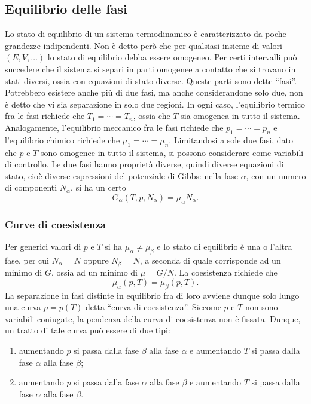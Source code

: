 \subsection{Equilibrio delle fasi}
Lo stato di equilibrio di un sistema termodinamico è caratterizzato da poche grandezze indipendenti. Non è detto però che per qualsiasi insieme di valori $(E,V,\dots)$ lo stato di equilibrio debba essere omogeneo. Per certi intervalli può succedere che il sistema si separi in parti omogenee a contatto che si trovano in stati diversi, ossia con equazioni di stato diverse. Queste parti sono dette ``fasi''. Potrebbero esistere anche più di due fasi, ma anche considerandone solo due, non è detto che vi sia separazione in solo due regioni. In ogni caso, l'equilibrio termico fra le fasi richiede che $T_1 = \cdots = T_n$, ossia che $T$ sia omogenea in tutto il sistema. Analogamente, l'equilibrio meccanico fra le fasi richiede che $p_1 = \cdots = p_n$ e l'equilibrio chimico richiede che $\mu_1 = \cdots = \mu_n$. Limitandosi a sole due fasi, dato che $p$ e $T$ sono omogenee in tutto il sistema, si possono considerare come variabili di controllo. Le due fasi hanno proprietà diverse, quindi diverse equazioni di stato, cioè diverse  espressioni del potenziale di Gibbs: nella fase $\alpha$, con un numero di componenti $N_\alpha$, si ha un certo
\begin{equation}
    G_\alpha(T,p,N_\alpha) = \mu_\alpha N_\alpha.
\end{equation}

\subsubsection{Curve di coesistenza}
Per generici valori di $p$ e $T$ si ha $\mu_\alpha \neq \mu_\beta$ e lo stato di equilibrio è una o l'altra fase, per cui $N_\alpha = N$ oppure $N_\beta = N$, a seconda di quale corrisponde ad un minimo di $G$, ossia ad un minimo di $\mu = G/N$. La coesistenza richiede che 
\begin{equation}
\label{eq: condizione coesistenza}
    \mu_\alpha(p,T) = \mu_\beta(p,T).
\end{equation}
La separazione in fasi distinte in equilibrio fra di loro avviene dunque solo lungo una curva $p = p(T)$ detta ``curva di coesistenza''. Siccome $p$ e $T$ non sono variabili coniugate, la pendenza della curva di coesistenza non è fissata. Dunque, un tratto di tale curva può essere di due tipi:
\begin{enumerate}
    \item aumentando $p$ si passa dalla fase $\beta$ alla fase $\alpha$ e aumentando $T$ si passa dalla fase $\alpha$ alla fase $\beta$;
    \item aumentando $p$ si passa dalla fase $\alpha$ alla fase $\beta$ e aumentando $T$ si passa dalla fase $\alpha$ alla fase $\beta$.
\end{enumerate}

